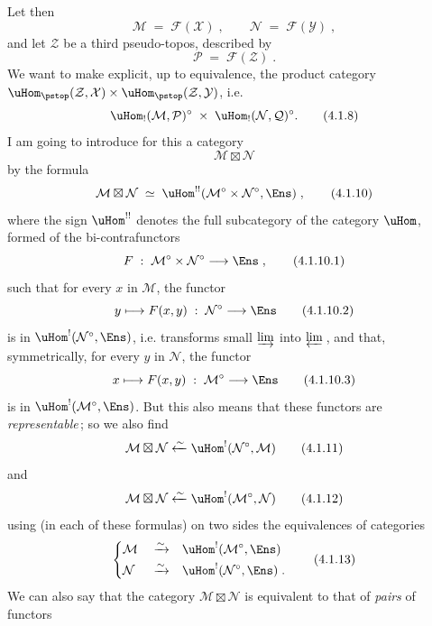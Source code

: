 Let then
\[
\mathcal{M} \;=\; \mathcal{F}(\mathcal{X})\;, \qquad \mathcal{N} \;=\; \mathcal{F}(\mathcal{Y})\;,
\tag*{(4.1.6)}
\]
and let $\mathcal{Z}$ be a third pseudo-topos, described by
\[
\mathcal{P} \;=\; \mathcal{F}(\mathcal{Z})\;.
\tag*{(4.1.7)}
\]
We want to make explicit, up to equivalence, the product category $\uHom_{\pstop}(\mathcal{Z},\mathcal{X})\times\uHom_{\pstop}(\mathcal{Z},\mathcal{Y})$, i.e.
\[
\uHom_!(\mathcal{M},\mathcal{P})^\circ \;\times\; \uHom_!(\mathcal{N},\mathcal{Q})^\circ.
\tag*{(4.1.8)}
\] %
I am going to introduce for this a category
\[
\mathcal{M}\boxtimes\mathcal{N}
\tag*{(4.1.9)}
\]
by the formula
\[
\mathcal{M}\boxtimes\mathcal{N} \;\simeq\; \uHom^{!!}(\mathcal{M}^\circ\times\mathcal{N}^\circ,\Ens)\;,
\tag*{(4.1.10)}
\]
where the sign $\uHom^{!!}$ denotes the full subcategory of the category $\uHom$, formed of the bi-contrafunctors %
\[
F \;:\; \mathcal{M}^\circ\times\mathcal{N}^\circ \longrightarrow \Ens\;,
\tag*{(4.1.10.1)}
\]
such that for every $x$ in $\mathcal{M}$, the functor
\[
y \longmapsto F(x,y) \;:\; \mathcal{N}^\circ \longrightarrow \Ens
\tag*{(4.1.10.2)}
\]
is in $\uHom^!(\mathcal{N}^\circ,\Ens)$, i.e. transforms small $\varinjlim$ into $\varprojlim$\,, and that, symmetrically, for every $y$ in $\mathcal{N}$, the functor
\[
x \longmapsto F(x,y) \;:\; \mathcal{M}^\circ \longrightarrow \Ens
\tag*{(4.1.10.3)}
\]
is in $\uHom^!(\mathcal{M}^\circ,\Ens)$. But this also means that these functors are \textit{representable}\,; so we also find
\[
\mathcal{M}\boxtimes\mathcal{N} \xleftarrow{\sim} \uHom^!(\mathcal{N}^\circ,\mathcal{M})
\tag*{(4.1.11)}
\]
and
\[
\mathcal{M}\boxtimes\mathcal{N} \xleftarrow{\sim} \uHom^!(\mathcal{M}^\circ,\mathcal{N})
\tag*{(4.1.12)}
\]
using (in each of these formulas) on two sides the equivalences of categories
\[
\left\{
\begin{aligned}
&\mathcal{M} &&\xrightarrow{\sim} &&\uHom^!(\mathcal{M}^\circ,\Ens)\\
&\mathcal{N} &&\xrightarrow{\sim} &&\uHom^!(\mathcal{N}^\circ,\Ens)\;.
\end{aligned}
\right.
\tag*{(4.1.13)}
\]
We can also say that the category $\mathcal{M}\boxtimes\mathcal{N}$ is equivalent to that of \textit{pairs} of functors
